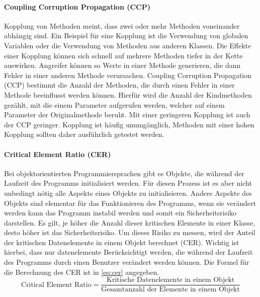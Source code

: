 \documentclass[12pt, a4paper, ngerman]{article}
\begin{document}
\paragraph{Coupling Corruption Propagation (CCP)}

Kopplung von Methoden meint, dass zwei oder mehr Methoden voneinander abhängig sind.
Ein Beispiel für eine Kopplung ist die Verwendung von globalen Variablen oder 
die Verwendung von Methoden aus anderen Klassen.
Die Effekte einer Kopplung können sich schnell auf mehrere Methoden tiefer in der Kette auswirken.
Angreifer können so Werte in einer Methode generieren, die dann Fehler in einer anderen Methode verursachen.
Coupling Corruption Propagation (CCP) bestimmt die Anzahl der Methoden, 
die durch einen Fehler in einer Methode beeinflusst werden können.
Hierfür wird die Anzahl der Kindmethoden gezählt, mit die einem Parameter aufgerufen werden, 
welcher auf einem Parameter der Originalmethode beruht.
Mit einer geringeren Kopplung ist auch der CCP geringer.
Kopplung ist häufig unumgänglich, Methoden mit einer hohen Kopplung sollten daher ausführlich getestet werden.

\paragraph{Critical Element Ratio (CER)}

Bei objektorientierten Programmiersprachen gibt es Objekte, 
die während der Laufzeit des Programms initialisiert werden. 
Für diesen Prozess ist es aber nicht unbedingt nötig alle Aspekte eines Objekts zu initialisieren.
Andere Aspekte des Objekts sind elementar für das Funktionieren des Programms, 
wenn sie verändert werden kann das Programm instabil werden und somit ein Sicherheitsrisiko darstellen.
Es gilt, je höher die Anzahl dieser kritischen Elemente in einer Klasse, desto höher ist das Sicherheitsrisiko.
Um dieses Risiko zu messen, wird der Anteil der kritischen Datenelemente in einem Objekt berechnet (CER).
Wichtig ist hierbei, dass nur datenelemente Berücksichtigt werden, 
die während der Laufzeit des Programms durch einen Benutzer verändert werden können.
Die Formel für die Berechnung des CER ist in \ref{eq:cer} angegeben.
\begin{equation} \label{eq:cer}
  \text{Critical Element Ratio} = \frac{ \text{Kritische Datenelemente in einem Objekt} }{ \text{Gesamtanzahl der Elemente in einem Objekt} }
\end{equation}
\end{document}
